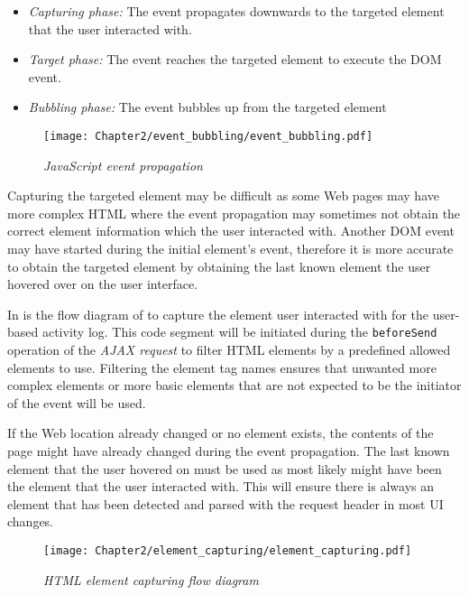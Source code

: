 \begin{itemize}
	\item \textit{Capturing phase:} The event propagates downwards to the targeted element that the user interacted with.
	\item \textit{Target phase:} The event reaches the targeted element to execute the DOM event.
	\item \textit{Bubbling phase:} The event bubbles up from the targeted element
\end{itemize}

\begin{figure}[!htb] %
	\centering %
	\texttt{[image: Chapter2/event\_bubbling/event\_bubbling.pdf]}
	\caption[JavaScript event propagation]
	{\textit{JavaScript event propagation~\cite{EventBubbling}}}\label{fig:ch2_event_bubbling}
\end{figure}

Capturing the targeted element may be difficult as some Web pages may have more complex HTML where the event propagation may sometimes not obtain the correct element information which the user interacted with. Another DOM event may have started during the initial element's event, therefore it is more accurate to obtain the targeted element by obtaining the last known element the user hovered over on the user interface.\par In  is the flow diagram of to capture the element user interacted with for the user-based activity log. This code segment will be initiated during the \texttt{beforeSend} operation of the \textit{AJAX request} to filter HTML elements by a predefined allowed elements to use. Filtering the element tag names ensures that unwanted more complex elements or more basic elements that are not expected to be the initiator of the event will be used. \par If the Web location already changed or no element exists, the contents of the page might have already changed during the event propagation. The last known element that the user hovered on must be used as most likely might have been the element that the user interacted with. This will ensure there is always an element that has been detected and parsed with the request header in most UI changes.

\clearpage

\begin{figure}[!htb] %
	\centering %
	\texttt{[image: Chapter2/element\_capturing/element\_capturing.pdf]}
	\caption[HTML element capturing flow diagram]
	{\textit{HTML element capturing flow diagram}}\label{fig:ch2_element_event_capturing}
\end{figure}


